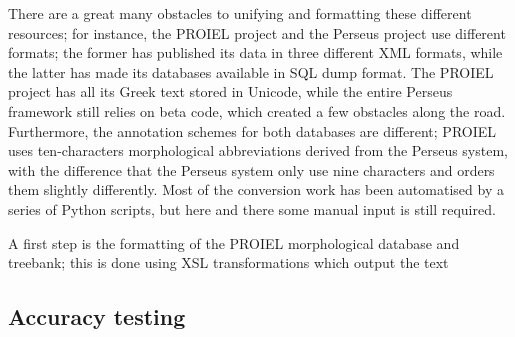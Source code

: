 There are a great many obstacles to unifying and formatting these different
resources; for instance, the PROIEL project and the Perseus project use
different formats; the former has published its data in three different XML
formats, while the latter has made its databases available in SQL dump format.
The PROIEL project has all its Greek text stored in Unicode, while the entire
Perseus framework still relies on beta code, which created a few obstacles
along the road. Furthermore, the annotation schemes for both databases are
different; PROIEL uses ten-characters morphological abbreviations derived from
the Perseus system, with the difference that the Perseus system only use nine
characters and orders them slightly differently. Most of the conversion work
has been automatised by a series of Python scripts, but here and there some manual input is still required. 

A first step is the formatting of the PROIEL morphological database and treebank; this is done using XSL transformations which output the text 

\subsection{Accuracy testing} %
\label{sub:accuracy-testing}



